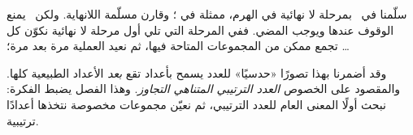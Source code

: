 \documentclass[../../../include/open-logic-section]{subfiles}
\begin{document}


سلّمنا في~ بمرحلة لا نهائية في الهرم، ممثلة في
\stagesinf{}؛ وقارن مسلّمة اللانهاية. ولكن~\stagessucc{} يمنع الوقوف
عندها ويوجب المضي. ففي المرحلة التي تلي أول مرحلة لا نهائية نكوّن كل
تجمع ممكن من المجموعات المتاحة فيها، ثم نعيد العملية مرة بعد مرة؛
\dots

وقد أضمرنا بهذا تصورًا «حدسيًا» للعدد يسمح بأعداد تقع \emph{بعد}
الأعداد الطبيعية كلها. والمقصود على الخصوص \emph{العدد الترتيبي
المتناهي التجاوز}. وهذا الفصل يضبط الفكرة: نبحث أولًا المعنى العام
للعدد الترتيبي، ثم نعيّن مجموعات مخصوصة نتخذها أعدادًا ترتيبية.
\end{document}
